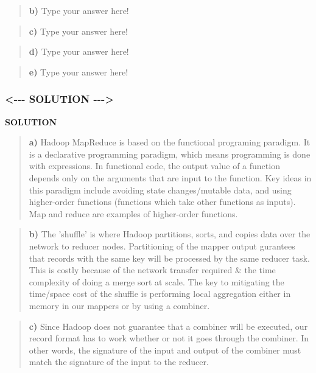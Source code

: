 \documentclass[11pt]{article}
\begin{document}
\begin{quote}
\textbf{b)} Type your answer here!
\end{quote}

\begin{quote}
\textbf{c)} Type your answer here!
\end{quote}

\begin{quote}
\textbf{d)} Type your answer here!
\end{quote}

\begin{quote}
\textbf{e)} Type your answer here!
\end{quote}

    \subsubsection{\textless{}-\/-\/- SOLUTION
-\/-\/-\textgreater{}}\label{solution----}

\textbf{SOLUTION}

\begin{quote}
\textbf{a)} Hadoop MapReduce is based on the functional programing
paradigm. It is a declarative programming paradigm, which means
programming is done with expressions. In functional code, the output
value of a function depends only on the arguments that are input to the
function. Key ideas in this paradigm include avoiding state
changes/mutable data, and using higher-order functions (functions which
take other functions as inputs). Map and reduce are examples of
higher-order functions.
\end{quote}

\begin{quote}
\textbf{b)} The 'shuffle' is where Hadoop partitions, sorts, and copies
data over the network to reducer nodes. Partitioning of the mapper
output gurantees that records with the same key will be processed by the
same reducer task. This is costly because of the network transfer
required \& the time complexity of doing a merge sort at scale. The key
to mitigating the time/space cost of the shuffle is performing local
aggregation either in memory in our mappers or by using a combiner.
\end{quote}

\begin{quote}
\textbf{c)} Since Hadoop does not guarantee that a combiner will be
executed, our record format has to work whether or not it goes through
the combiner. In other words, the signature of the input and output of
the combiner must match the signature of the input to the reducer.
\end{quote}
\end{document}
